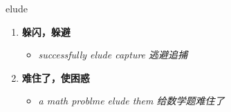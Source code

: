 
\begin{frame}
{\huge elude}
\begin{center}
\begin{enumerate}\Large
  \item \textbf{躲闪，躲避}
  \begin{itemize}
    \item \em{\Large{successfully elude capture 逃避追捕}}
  \end{itemize}
  \item \textbf{难住了，使困惑}
  \begin{itemize}
    \item \em{\Large{a math problme elude them 给数学题难住了}}
  \end{itemize}
\end{enumerate}
\end{center}
\end{frame}
